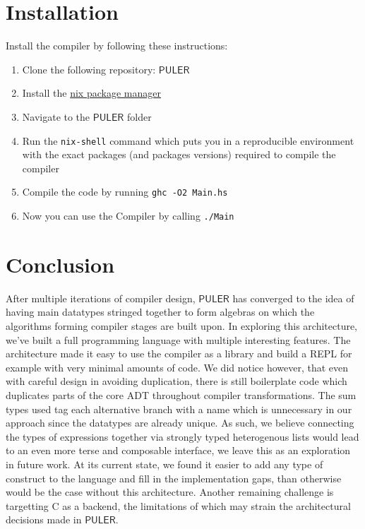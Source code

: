 \documentclass{article} %
\newcommand{\PULER}{\mathsf{PULER}}
\begin{document}
\section{Installation}
Install the compiler by following these instructions:
\begin{enumerate}
    \item Clone the following repository: \href{https://github.com/bmabsout/PULER.git}{$\PULER$}
    \item Install the \href{https://nixos.org/nix/}{nix package manager}
    \item Navigate to the $\PULER$ folder
    \item Run the \texttt{nix-shell} command which puts you in a reproducible environment with the exact packages (and packages versions) required to compile the compiler
    \item Compile the code by running \texttt{ghc -O2 Main.hs}
    \item Now you can use the Compiler by calling \texttt{./Main}
\end{enumerate}


\section {Conclusion}
    After multiple iterations of compiler design, $\PULER$ has converged to the idea of having main datatypes stringed together to form algebras on which the algorithms forming compiler stages are built upon. In exploring this architecture, we've built a full programming language with multiple interesting features. The architecture made it easy to use the compiler as a library and build a REPL for example with very minimal amounts of code. We did notice however, that even with careful design in avoiding duplication, there is still boilerplate code which duplicates parts of the core ADT throughout compiler transformations. The sum types used tag each alternative branch with a name which is unnecessary in our approach since the datatypes are already unique. As such, we believe connecting the types of expressions together via strongly typed heterogenous lists \cite{hlist} would lead to an even more terse and composable interface, we leave this as an exploration in future work. 
    At its current state, we found it easier to add any type of construct to the language and fill in the implementation gaps, than otherwise would be the case without this architecture.
    Another remaining challenge is targetting C as a backend, the limitations of which may strain the architectural decisions made in $\PULER$.



\end{document}
